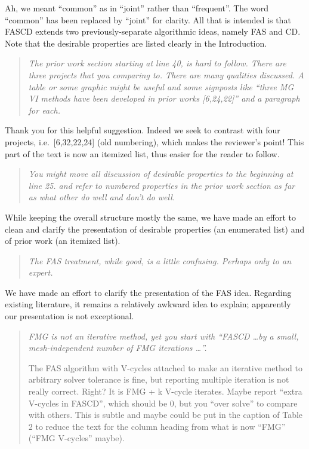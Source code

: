 \documentclass[letterpaper,final,12pt,reqno]{amsart}
\newenvironment{review}%
{\bigskip \par \begin{quote} \selectfont \sl}%
{\end{quote}}
\newcommand\short[1]{\medskip\noindent #1}   %
\begin{document}
\short{Ah, we meant ``common'' as in ``joint'' rather than ``frequent''. The word ``common'' has been replaced by ``joint'' for clarity.  All that is intended is that FASCD extends two previously-separate algorithmic ideas, namely FAS and CD.  Note that the desirable properties are listed clearly in the Introduction.}

\begin{review}
The prior work section starting at line 40, is hard to follow.  There are three projects that you comparing to.  There are many qualities discussed.  A table or some graphic might be useful and some signposts like ``three MG VI methods have been developed in prior works [6,24,22]'' and a paragraph for each.
\end{review}

\short{Thank you for this helpful suggestion. Indeed we seek to contrast with four projects, i.e.~[6,32,22,24] (old numbering), which makes the reviewer's point!  This part of the text is now an itemized list, thus easier for the reader to follow.}

\begin{review}
You might move all discussion of desirable properties to the beginning at line 25. and refer to numbered properties in the prior work section as far as what other do well and don't do well.
\end{review}

\short{While keeping the overall structure mostly the same, we have made an effort to clean and clarify the presentation of desirable properties (an enumerated list) and of prior work (an itemized list).}

\begin{review}
The FAS treatment, while good, is a little confusing.  Perhaps only to an expert.
\end{review}

\short{We have made an effort to clarify the presentation of the FAS idea. Regarding existing literature, it remains a relatively awkward idea to explain; apparently our presentation is not exceptional.}

\begin{review}
FMG is not an iterative method, yet you start with ``FASCD \dots by a small, mesh-independent number of FMG iterations \dots''.

The FAS algorithm with V-cycles attached to make an iterative method to arbitrary solver tolerance is fine, but reporting multiple iteration is not really correct.  Right?  It is FMG + k V-cycle iterates.  Maybe report ``extra V-cycles in FASCD'', which should be 0, but you ``over solve'' to compare with others.  This is subtle and maybe could be put in the caption of Table 2 to reduce the text for the column heading from what is now ``FMG'' (``FMG V-cycles'' maybe).
\end{review}
\end{document}
